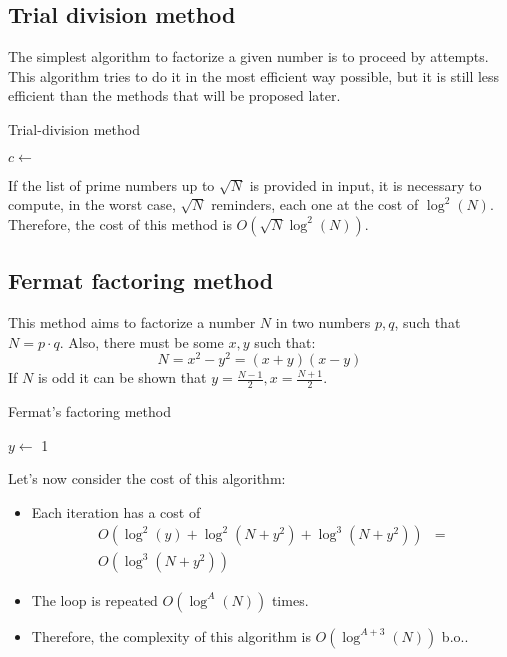 \subsection{Trial division method}
The simplest algorithm to factorize a given number is to proceed by attempts. \newline
This algorithm tries to do it in the most efficient way possible, but it is still less efficient than the methods that will be proposed later.
\begin{algorithm}
\caption{Trial-division method}\label{alg:trial_division_method}
$c \gets$ \;
\;
\end{algorithm}
If the list of prime numbers up to $\sqrt{N}$ is provided in input, it is necessary to compute, in the worst case, $\sqrt{N}$ reminders, each one at the cost of $\operatorname{log}^{2}(N)$. \newline
Therefore, the cost of this method is $O(\sqrt{N} \operatorname{log}^{2}(N))$.

\subsection{Fermat factoring method}
This method aims to factorize a number $N$ in two numbers $p, q$, such that $N = p \cdot q$. Also, there must be some $x,y$ such that:
\[
N = x^{2} - y^{2} = (x + y)(x - y)
\]
If $N$ is odd it can be shown that $y = \frac{N - 1}{2}, x = \frac{N + 1}{2}$.
\begin{algorithm}
\caption{Fermat's factoring method}\label{alg:fermat_factoring_method}
$y \gets$ 1\;
\end{algorithm}
Let's now consider the cost of this algorithm:
\begin{itemize}
    \item Each iteration has a cost of
    \begin{align*}
        O(\operatorname{log}^{2}(y) + \operatorname{log}^{2}(N + y^{2}) + \operatorname{log}^{3}(N + y^{2})) & = \\
        O(\operatorname{log}^{3}(N + y^{2}))
    \end{align*}
    \item The loop is repeated $O(\operatorname{log}^{A}(N))$ times.
    \item Therefore, the complexity of this algorithm is $O(\operatorname{log}^{A + 3}(N))$ b.o..
\end{itemize}

